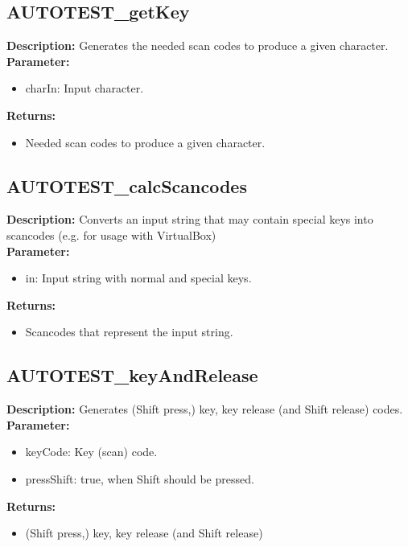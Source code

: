 \subsection{AUTOTEST\_getKey}
\textbf{Description:} Generates the needed scan codes to produce a given character.\\
\textbf{Parameter:}
\begin{itemize}
\item charIn: Input character.
\end{itemize}
\textbf{Returns:}
\begin{itemize}
\item Needed scan codes to produce a given character.
\end{itemize}

\subsection{AUTOTEST\_calcScancodes}
\textbf{Description:} Converts an input string that may contain special keys into scancodes (e.g. for usage with VirtualBox)\\
\textbf{Parameter:}
\begin{itemize}
\item in: Input string with normal and special keys.
\end{itemize}
\textbf{Returns:}
\begin{itemize}
\item Scancodes that represent the input string.
\end{itemize}

\subsection{AUTOTEST\_keyAndRelease}
\textbf{Description:} Generates (Shift press,) key, key release (and Shift release) codes.\\
\textbf{Parameter:}
\begin{itemize}
\item keyCode: Key (scan) code.
\item pressShift: true, when Shift should be pressed.
\end{itemize}
\textbf{Returns:}
\begin{itemize}
\item (Shift press,) key, key release (and Shift release)
\end{itemize}


